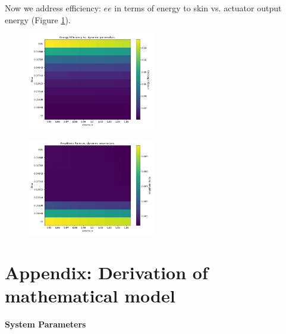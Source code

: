 \documentclass[letterpaper,11pt]{article}
\begin{document}
Now we address efficiency: $ee$ in terms of energy to skin vs. actuator output energy
(Figure \ref{EEficFig}).



\begin{figure}
\includegraphics[width=0.5\textwidth]{heatmap_ee_10x10.png}
\caption{}\label{EEficFig}
\end{figure}




\begin{figure}
\includegraphics[width=0.5\textwidth]{heatmap_gain_10x10.png}
\caption{}\label{GainFig}
\end{figure}



\clearpage
\newpage\section*{Appendix: Derivation of mathematical model}
\noindent \textbf{System Parameters}
\end{document}
